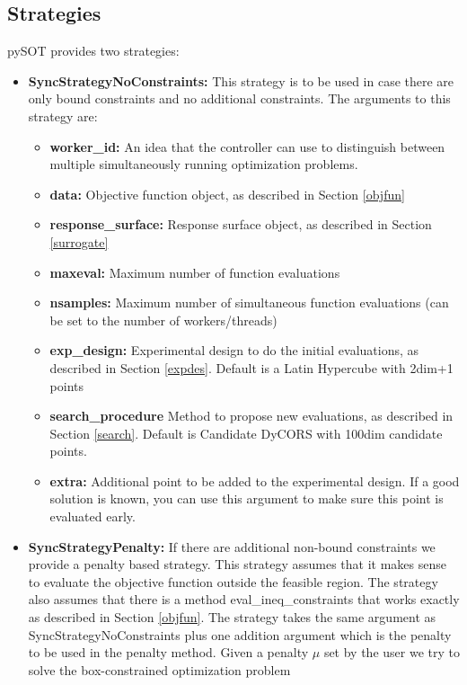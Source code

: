 \documentclass[]{article}
\begin{document}
\subsection{Strategies} pySOT provides two strategies:
\begin{itemize}
\item \textbf{SyncStrategyNoConstraints:} This strategy is to be used in case there are only bound constraints and no additional constraints. The arguments to this strategy are:
\begin{itemize}
\item \textbf{worker\_id:} An idea that the controller can use to distinguish between multiple simultaneously running optimization problems.
\item \textbf{data:} Objective function object, as described in Section \ref{objfun}
\item \textbf{response\_surface:} Response surface object, as described in Section \ref{surrogate}
\item \textbf{maxeval:} Maximum number of function evaluations
\item \textbf{nsamples:} Maximum number of simultaneous function evaluations (can be set to the number of workers/threads)
\item \textbf{exp\_design:} Experimental design to do the initial evaluations, as described in Section \ref{expdes}. Default is a Latin Hypercube with 2dim+1 points
\item \textbf{search\_procedure} Method to propose new evaluations, as described in Section \ref{search}. Default is Candidate DyCORS with 100dim candidate points.
\item \textbf{extra:} Additional point to be added to the experimental design. If a good solution is known, you can use this argument to make sure this point is evaluated early. 
\end{itemize}
\item \textbf{SyncStrategyPenalty:} If there are additional non-bound constraints we provide a penalty based strategy. This strategy assumes that it makes sense to evaluate the objective function outside the feasible region. The strategy also assumes that there is a method eval\_ineq\_constraints that works exactly as described in Section \ref{objfun}. The strategy takes the same argument as SyncStrategyNoConstraints plus one addition argument which is the penalty to be used in the penalty method. Given a penalty $\mu$ set by the user we try to solve the box-constrained optimization problem 
\begin{align*}

\end{align*}
\end{itemize}
\end{document}
